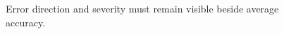 \begin{figure}[H]
\centering
{}
\caption{Error direction and severity must remain visible beside average accuracy.}\label{fig:teach-M09-06}
\end{figure}

